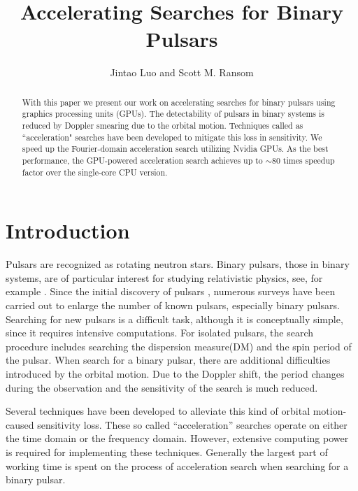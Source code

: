 \documentclass[preprint2]{aastex}
\begin{document}
\title{Accelerating Searches for Binary Pulsars}

\author{Jintao Luo and Scott M. Ransom}



\begin{abstract}
With this paper we present our work on accelerating searches for binary pulsars 
using graphics processing units (GPUs).
The detectability of pulsars in binary systems is reduced by Doppler smearing 
due to the orbital motion. Techniques called as ``acceleration" searches have been 
developed to mitigate  this loss in sensitivity. We speed up the Fourier-domain 
acceleration search utilizing Nvidia GPUs. As the best performance, the GPU-powered 
acceleration search achieves up to $\sim$80 times speedup factor over the single-core CPU version.
\end{abstract}

\section{Introduction}

Pulsars are recognized as rotating neutron stars. Binary pulsars, those in 
binary systems, are of particular interest for studying relativistic physics,
 see, for example \citet{tay89}. 
Since the initial discovery of pulsars\citep{hew68}
, numerous surveys have been carried out to enlarge the number of known pulsars, 
especially binary pulsars. Searching for new pulsars is a difficult task, although it is 
conceptually simple, since it requires intensive computations.
For isolated pulsars, the search procedure includes searching the dispersion measure(DM) 
and the spin period of the pulsar. When search for a binary pulsar, there 
are additional difficulties introduced by the orbital motion.
Due to the Doppler shift, the period changes during the observation and 
the sensitivity of the search is much reduced.

Several techniques have been developed to alleviate this kind of orbital motion-caused 
sensitivity loss\citep[e.g.][]{mid84}. These so called ``acceleration'' searches operate on 
either the time domain or the frequency domain. However, extensive computing 
power is required for implementing these techniques. Generally the largest part of 
working time is spent on the process of acceleration 
search when searching for a binary pulsar.
\end{document}
